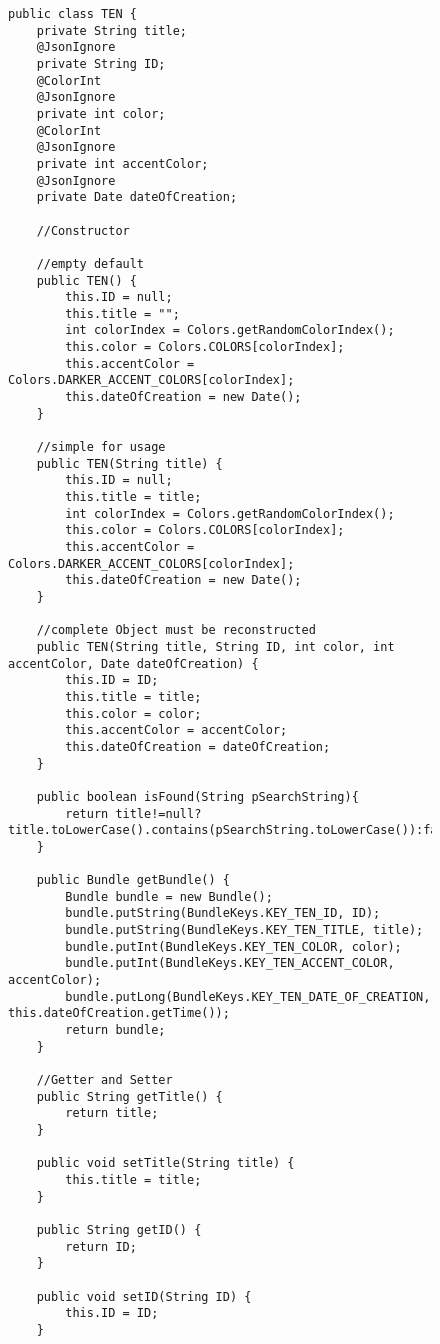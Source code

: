 \begin{figure}[H]
\begin{lstlisting}[caption=TEN (Joscha Nassenstein)]
public class TEN {
    private String title;
    @JsonIgnore
    private String ID;
    @ColorInt
    @JsonIgnore
    private int color;
    @ColorInt
    @JsonIgnore
    private int accentColor;
    @JsonIgnore
    private Date dateOfCreation;

    //Constructor

    //empty default
    public TEN() {
        this.ID = null;
        this.title = "";
        int colorIndex = Colors.getRandomColorIndex();
        this.color = Colors.COLORS[colorIndex];
        this.accentColor = Colors.DARKER_ACCENT_COLORS[colorIndex];
        this.dateOfCreation = new Date();
    }

    //simple for usage
    public TEN(String title) {
        this.ID = null;
        this.title = title;
        int colorIndex = Colors.getRandomColorIndex();
        this.color = Colors.COLORS[colorIndex];
        this.accentColor = Colors.DARKER_ACCENT_COLORS[colorIndex];
        this.dateOfCreation = new Date();
    }

    //complete Object must be reconstructed
    public TEN(String title, String ID, int color, int accentColor, Date dateOfCreation) {
        this.ID = ID;
        this.title = title;
        this.color = color;
        this.accentColor = accentColor;
        this.dateOfCreation = dateOfCreation;
    }

    public boolean isFound(String pSearchString){
        return title!=null?title.toLowerCase().contains(pSearchString.toLowerCase()):false;
    }

    public Bundle getBundle() {
        Bundle bundle = new Bundle();
        bundle.putString(BundleKeys.KEY_TEN_ID, ID);
        bundle.putString(BundleKeys.KEY_TEN_TITLE, title);
        bundle.putInt(BundleKeys.KEY_TEN_COLOR, color);
        bundle.putInt(BundleKeys.KEY_TEN_ACCENT_COLOR, accentColor);
        bundle.putLong(BundleKeys.KEY_TEN_DATE_OF_CREATION, this.dateOfCreation.getTime());
        return bundle;
    }

    //Getter and Setter
    public String getTitle() {
        return title;
    }

    public void setTitle(String title) {
        this.title = title;
    }

    public String getID() {
        return ID;
    }

    public void setID(String ID) {
        this.ID = ID;
    }


\end{lstlisting}
\end{figure}
